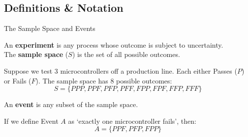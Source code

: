 \subsection{Definitions \& Notation}

\begin{frame}[allowframebreaks]{The Sample Space and Events}
    \begin{definition}
        An \textbf{experiment} is any process whose outcome is subject to uncertainty. \\
        The \textbf{sample space} ($S$) is the set of all possible outcomes.
    \end{definition}
    


    \begin{example}
        Suppose we test 3 microcontrollers off a production line. Each either Passes ($P$) or Fails ($F$). 
        The sample space has 8 possible outcomes:
        \[ S = \{PPP, PPF, PFP, PFF, FPP, FPF, FFP, FFF\} \]
    \end{example}
    

    \begin{definition}[Event]
        An \textbf{event} is any subset of the sample space. 
    \end{definition}
    
    
    
    If we define Event $A$ as \lq exactly one microcontroller fails\rq, then:
    \[ A = \{PPF, PFP, FPP\} \]
\end{frame}

